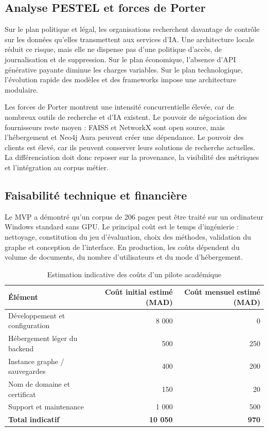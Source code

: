\documentclass[12pt,a4paper,oneside]{report}
\begin{document}
\subsection{Analyse PESTEL et forces de Porter}
Sur le plan politique et légal, les organisations recherchent davantage de contrôle sur les données qu'elles transmettent aux services d'IA. Une architecture locale réduit ce risque, mais elle ne dispense pas d'une politique d'accès, de journalisation et de suppression. Sur le plan économique, l'absence d'API générative payante diminue les charges variables. Sur le plan technologique, l'évolution rapide des modèles et des frameworks impose une architecture modulaire.

Les forces de Porter montrent une intensité concurrentielle élevée, car de nombreux outils de recherche et d'IA existent. Le pouvoir de négociation des fournisseurs reste moyen : FAISS et NetworkX sont open source, mais l'hébergement et Neo4j Aura peuvent créer une dépendance. Le pouvoir des clients est élevé, car ils peuvent conserver leurs solutions de recherche actuelles. La différenciation doit donc reposer sur la provenance, la visibilité des métriques et l'intégration au corpus métier.

\subsection{Faisabilité technique et financière}
Le MVP a démontré qu'un corpus de 206 pages peut être traité sur un ordinateur Windows standard sans GPU. Le principal coût est le temps d'ingénierie : nettoyage, constitution du jeu d'évaluation, choix des méthodes, validation du graphe et conception de l'interface. En production, les coûts dépendent du volume de documents, du nombre d'utilisateurs et du mode d'hébergement.

\begin{table}[H]
\centering
\caption{Estimation indicative des coûts d'un pilote académique}
\begin{tabularx}{0.92\textwidth}{Xrr}
\toprule
\textbf{Élément} & \textbf{Coût initial estimé (MAD)} & \textbf{Coût mensuel estimé (MAD)}\\
\midrule
Développement et configuration & 8 000 & 0\\
Hébergement léger du backend & 500 & 250\\
Instance graphe / sauvegardes & 400 & 200\\
Nom de domaine et certificat & 150 & 20\\
Support et maintenance & 1 000 & 500\\
\midrule
\textbf{Total indicatif} & \textbf{10 050} & \textbf{970}\\
\bottomrule
\end{tabularx}
\end{table}
\end{document}

